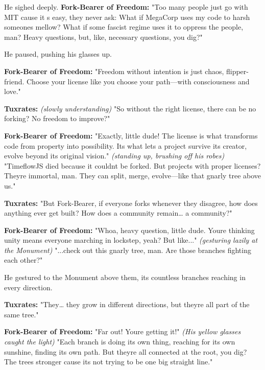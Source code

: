 He sighed deeply. \textbf{Fork-Bearer of Freedom:} "Too many people just go with MIT \textquotesingle cause it\textquotesingle{} s easy, they never ask: What if MegaCorp uses my code to harsh someone\textquotesingle s mellow? What if some fascist regime uses it to oppress the people, man? Heavy questions, but, like, necessary questions, you dig?"

He paused, pushing his glasses up.

\textbf{Fork-Bearer of Freedom:} "Freedom without intention is just chaos, flipper-friend. Choose your license like you choose your path---with consciousness and love."

\textbf{Tuxrates:} \emph{(slowly understanding)} "So without the right license, there can be no forking? No freedom to improve?"

\textbf{Fork-Bearer of Freedom:} "Exactly, little dude! The license is what transforms code from property into possibility. It\textquotesingle s what lets a project survive its creator, evolve beyond its original vision." \emph{(standing up, brushing off his robes)} "TimeflowJS died because it couldn\textquotesingle t be forked. But projects with proper licenses? They\textquotesingle re immortal, man. They can split, merge, evolve---like that gnarly tree above us."

\textbf{Tuxrates:} "But Fork-Bearer, if everyone forks whenever they disagree, how does anything ever get built? How does a community remain\ldots{} a community?"

\textbf{Fork-Bearer of Freedom:} "Whoa, heavy question, little dude. You\textquotesingle re thinking unity means everyone marching in lockstep, yeah? But like..." \emph{(gesturing lazily at the Monument)} "...check out this gnarly tree, man. Are those branches fighting each other?"

He gestured to the Monument above them, its countless branches reaching in every direction.

\textbf{Tuxrates:} "They\ldots{} they grow in different directions, but they\textquotesingle re all part of the same tree."

\textbf{Fork-Bearer of Freedom:} "Far out! You\textquotesingle re getting it!" \emph{(His yellow glasses caught the light)} "Each branch is doing its own thing, reaching for its own sunshine, finding its own path. But they\textquotesingle re all connected at the root, you dig? The tree\textquotesingle s stronger \textquotesingle cause it\textquotesingle s not trying to be one big straight line."

